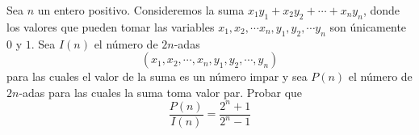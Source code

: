 Sea $n$ un entero positivo. Consideremos la suma $x_1y_1 + x_2y_2 + \cdots + x_ny_n$, donde los valores que pueden tomar las variables $x_1,x_2,\cdots x_n,y_1,y_2,\cdots y_n$ son únicamente $0$ y $1$. Sea $I(n)$ el número de $2n$-adas
\[ (x_1,x_2,\cdots , x_n,y_1,y_2,\cdots , y_n) \]
para las cuales el valor de la suma es un número impar y sea $P(n)$ el número de $2n$-adas para las cuales la suma toma valor par. Probar que
\[ \frac{P(n)}{I(n)} = \frac{2^n + 1}{2^n - 1} \]
